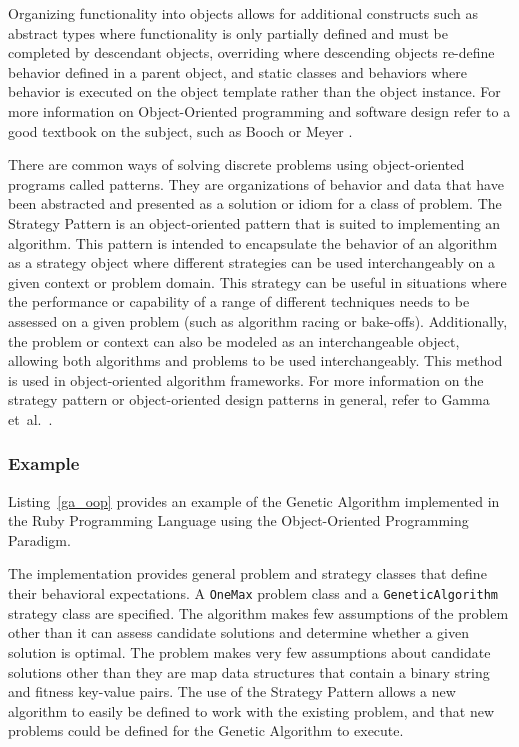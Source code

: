Organizing functionality into objects allows for additional constructs such as abstract types where functionality is only partially defined and must be completed by descendant objects, overriding where descending objects re-define behavior defined in a parent object, and static classes and behaviors where behavior is executed on the object template rather than the object instance. 
For more information on Object-Oriented programming and software design refer to a good textbook on the subject, such as Booch \cite{Booch1997} or Meyer \cite{Meyer1997}.

There are common ways of solving discrete problems using object-oriented programs called patterns. They are organizations of behavior and data that have been abstracted and presented as a solution or idiom for a class of problem. The Strategy Pattern is an object-oriented pattern that is suited to implementing an algorithm. This pattern is intended to encapsulate the behavior of an algorithm as a strategy object where different strategies can be used interchangeably on a given context or problem domain. This strategy can be useful in situations where the performance or capability of a range of different techniques needs to be assessed on a given problem (such as algorithm racing or bake-offs). Additionally, the problem or context can also be modeled as an interchangeable object, allowing both algorithms and problems to be used interchangeably. This method is used in object-oriented algorithm frameworks.
For more information on the strategy pattern or object-oriented design patterns in general, refer to Gamma et~al.\ \cite{Gamma1995}.

\subsubsection{Example}
Listing~\ref{ga_oop} provides an example of the Genetic Algorithm implemented in the Ruby Programming Language using the Object-Oriented Programming Paradigm. 

The implementation provides general problem and strategy classes that define their behavioral expectations. A \texttt{One\-Max} problem class and a \texttt{Genetic\-Algorithm} strategy class are specified. The algorithm makes few assumptions of the problem other than it can assess candidate solutions and determine whether a given solution is optimal. The problem makes very few assumptions about candidate solutions other than they are map data structures that contain a binary string and fitness key-value pairs. The use of the Strategy Pattern allows a new algorithm to easily be defined to work with the existing problem, and that new problems could be defined for the Genetic Algorithm to execute.

